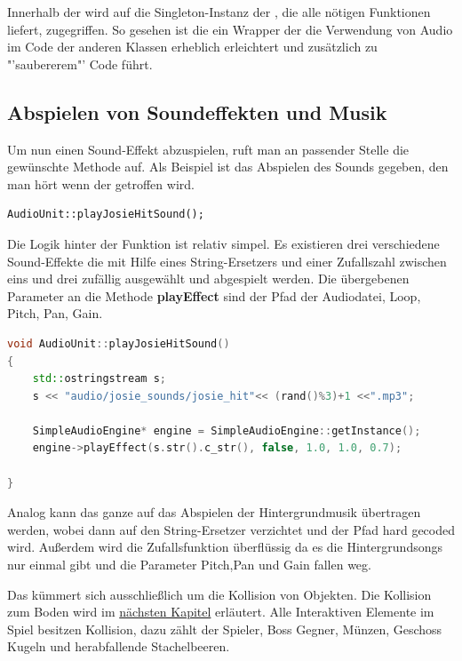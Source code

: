 Innerhalb der  wird auf die Singleton-Instanz der , die alle nötigen Funktionen liefert, zugegriffen. So gesehen ist die  ein Wrapper der die Verwendung von Audio im Code der anderen Klassen erheblich erleichtert und zusätzlich zu "'saubererem"' Code führt. 



\subsection{Abspielen von Soundeffekten und Musik} 
Um nun einen Sound-Effekt abzuspielen, ruft man an passender Stelle die gewünschte Methode auf. Als Beispiel ist das Abspielen des Sounds gegeben, den man hört wenn der  getroffen wird.

\begin{lstlisting}[style=singleline]
AudioUnit::playJosieHitSound();
\end{lstlisting}

Die Logik hinter der Funktion ist relativ simpel. Es existieren drei verschiedene Sound-Effekte die mit Hilfe eines String-Ersetzers und einer Zufallszahl zwischen eins und drei zufällig ausgewählt und abgespielt werden. Die übergebenen Parameter an die Methode \textbf{playEffect} sind der Pfad der Audiodatei, Loop, Pitch, Pan, Gain.

\begin{lstlisting}[label=lst:playJosieShootSound,
				   language=C++,
				   firstnumber=30,
				   caption=BossLevel Shoot Sound abspielen ( AudioUnit.cpp )]
void AudioUnit::playJosieHitSound()
{
	std::ostringstream s;
	s << "audio/josie_sounds/josie_hit"<< (rand()%3)+1 <<".mp3";

	SimpleAudioEngine* engine = SimpleAudioEngine::getInstance();
	engine->playEffect(s.str().c_str(), false, 1.0, 1.0, 0.7);
	
}
\end{lstlisting}

Analog kann das ganze auf das Abspielen der Hintergrundmusik übertragen werden, wobei dann auf den String-Ersetzer verzichtet und der Pfad hard gecoded wird. Außerdem wird die Zufallsfunktion überflüssig da es die Hintergrundsongs nur einmal gibt und die Parameter Pitch,Pan und Gain fallen weg.



\label{sec:4_CollisionLayer}

Das  kümmert sich ausschließlich um die Kollision von Objekten. Die Kollision zum Boden wird im \href{sec:4_Kollisionsabfrage}{nächsten Kapitel} erläutert. Alle Interaktiven Elemente im Spiel besitzen Kollision, dazu zählt der Spieler, Boss Gegner, Münzen, Geschoss Kugeln und herabfallende Stachelbeeren.

